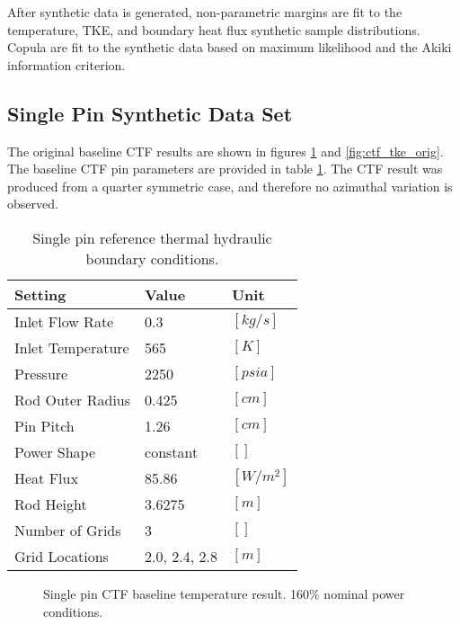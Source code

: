 After synthetic data is generated, non-parametric margins are fit to the temperature, TKE, and boundary heat flux synthetic sample distributions.  Copula are fit to the synthetic data based on maximum likelihood and the Akiki information criterion. 

\subsection{Single Pin Synthetic Data Set}

The original baseline CTF results are shown in figures \ref{fig:ctf_twall_orig} and \ref{fig:ctf_tke_orig}.  The baseline CTF pin parameters are provided in table \ref{tab:pin_settings}.  The CTF result was produced from a quarter symmetric case, and therefore no azimuthal variation is observed.

\begin{table}[h]
    \begin{center}
        \caption{Single pin reference thermal hydraulic boundary conditions.}
        \begin{tabular}{|l|l|l|}
            \hline
            Setting & Value & Unit \\
            \hline
            Inlet Flow Rate & 0.3 & $[kg/s]$ \\
            Inlet Temperature & 565 & $[K]$ \\
            Pressure & 2250 & $[psia]$ \\
            Rod Outer Radius & 0.425 & $[cm]$ \\
            Pin Pitch & 1.26 & $[cm]$ \\
            Power Shape & constant & $[]$ \\
            Heat Flux & 85.86  & $[W/m^2]$ \\
            Rod Height & 3.6275 & $[m]$ \\
            Number of Grids & 3  & $[]$ \\
            Grid Locations & 2.0, 2.4, 2.8 & $[m]$ \\
            \hline
        \end{tabular}
    \label{tab:pin_settings}
    \end{center}
\end{table}

\begin{figure}[H]%
    \centering
    \qquad
    \caption[Single pin CTF baseline temperature result.  160\% nominal power conditions.]{Single pin CTF baseline temperature result.  160\% nominal power conditions.}%
    \label{fig:ctf_twall_orig}%
\end{figure}

